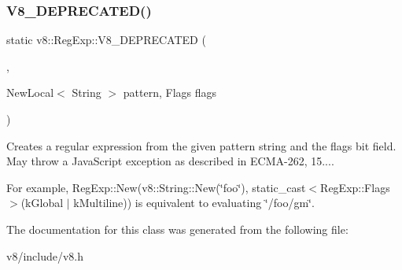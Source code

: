 \subsubsection{\texorpdfstring{V8\+\_\+\+D\+E\+P\+R\+E\+C\+A\+T\+E\+D()}{V8\_DEPRECATED()}}
{\footnotesize\ttfamily static v8\+::\+Reg\+Exp\+::\+V8\+\_\+\+D\+E\+P\+R\+E\+C\+A\+T\+ED (\begin{DoxyParamCaption}\item[{\char`\"{}Use maybe version\char`\"{}}]{,  }\item[{\mbox{\hyperlink{classv8_1_1Local}{Local}}$<$ \mbox{\hyperlink{classv8_1_1RegExp}{Reg\+Exp}} $>$ }]{NewLocal$<$ String $>$ pattern, Flags flags }\end{DoxyParamCaption})\hspace{0.3cm}{\ttfamily [static]}}

Creates a regular expression from the given pattern string and the flags bit field. May throw a Java\+Script exception as described in E\+C\+M\+A-\/262, 15....

For example, Reg\+Exp\+::\+New(v8\+::\+String\+::\+New(\char`\"{}foo\char`\"{}), static\+\_\+cast$<$\+Reg\+Exp\+::\+Flags$>$(k\+Global $\vert$ k\+Multiline)) is equivalent to evaluating \char`\"{}/foo/gm\char`\"{}. 

The documentation for this class was generated from the following file\+:\begin{DoxyCompactItemize}
\item 
v8/include/v8.\+h\end{DoxyCompactItemize}
